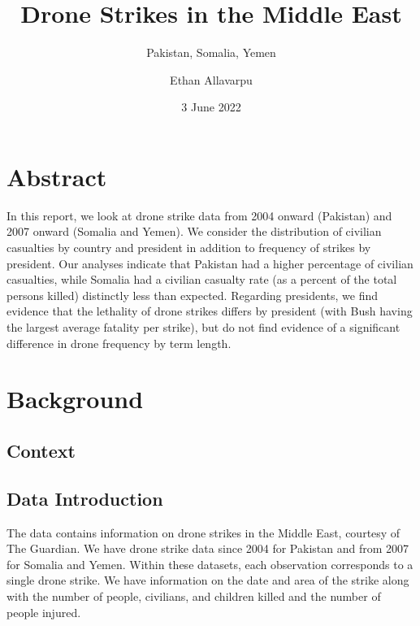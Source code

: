 \documentclass[
]{article}
\title{Drone Strikes in the Middle East}
\subtitle{Pakistan, Somalia, Yemen}
\author{Ethan Allavarpu}
\date{3 June 2022}
\begin{document}
\maketitle

{
\setcounter{tocdepth}{1}
\tableofcontents
}
\vfill

\hypertarget{abstract}{%
\section{Abstract}\label{abstract}}

In this report, we look at drone strike data from 2004 onward (Pakistan)
and 2007 onward (Somalia and Yemen). We consider the distribution of
civilian casualties by country and president in addition to frequency of
strikes by president. Our analyses indicate that Pakistan had a higher
percentage of civilian casualties, while Somalia had a civilian casualty
rate (as a percent of the total persons killed) distinctly less than
expected. Regarding presidents, we find evidence that the lethality of
drone strikes differs by president (with Bush having the largest average
fatality per strike), but do not find evidence of a significant
difference in drone frequency by term length.

\pagebreak

\hypertarget{background}{%
\section{Background}\label{background}}

\hypertarget{context}{%
\subsection{Context}\label{context}}

\hypertarget{data-introduction}{%
\subsection{Data Introduction}\label{data-introduction}}

The data contains information on drone strikes in the Middle East,
courtesy of The Guardian. We have drone strike data since 2004 for
Pakistan and from 2007 for Somalia and Yemen. Within these datasets,
each observation corresponds to a single drone strike. We have
information on the date and area of the strike along with the number of
people, civilians, and children killed and the number of people injured.
\end{document}

